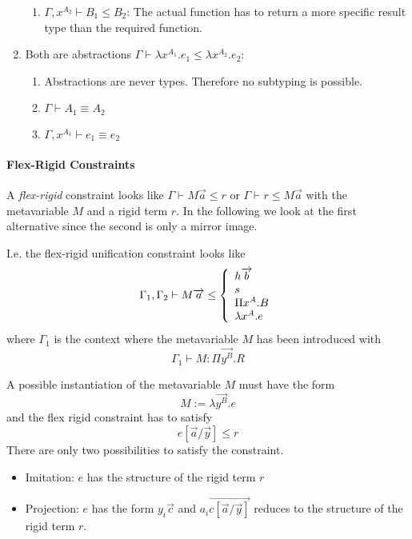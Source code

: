 \begin{enumerate}
\begin{enumerate}
            \item $\Gamma, x^{A_2} \vdash B_1 \le B_2$: The actual function has
                to return a more specific result type than the required
                function.
        \end{enumerate}

    \item Both are abstractions
        $ \Gamma \vdash \lambda x^{A_1}. e_1
                        \le
                        \lambda x^{A_2}. e_2$:

        \begin{enumerate}
            \item Abstractions are never types. Therefore no subtyping is
                possible.

            \item $\Gamma \vdash A_1 \equiv A_2$

            \item $\Gamma, x^{A_1} \vdash e_1 \equiv e_2$
        \end{enumerate}
\end{enumerate}







\paragraph{Flex-Rigid Constraints}

A \emph{flex-rigid} constraint looks like $\Gamma \vdash M \vec a \le r$ or
$\Gamma \vdash r \le  M \vec a$ with the metavariable $M$ and a rigid term $r$.
In the following we look at the first alternative since the second is only a
mirror image.

I.e. the flex-rigid unification constraint looks like
$$
%
    \Gamma_1, \Gamma_2
%
    \vdash
%
    M \vec a
%
    \le
%
    \cases {
        h \vec b
        \\
        s
        \\
        \Pi x^A. B
        \\
        \lambda x^A. e
    }
$$
%
where $\Gamma_1$ is the context where the metavariable $M$ has been
introduced with
$$
    \Gamma_1 \vdash M : \Pi \vec {y^B}. R
$$

A possible instantiation of the metavariable $M$ must have the form
$$
    M := \lambda \vec{y^B}. e
$$
and the flex rigid constraint has to satisfy
$$
    e[\vec a / \vec y] \le r
$$
There are only two possibilities to satisfy the constraint.
\begin{itemize}
    \item Imitation: $e$ has the structure of the rigid term $r$

    \item Projection: $e$ has the form $y_i \vec c$ and $a_i \vec{c[\vec a/\vec
        y]}$ reduces to the structure of the rigid term $r$.
\end{itemize}





